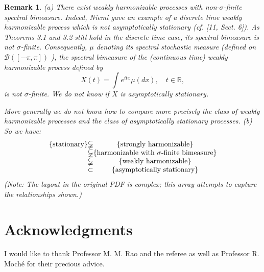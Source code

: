 \documentclass{article}
\begin{document}
\newtheorem{remark}{Remark}[section] %
\begin{remark} %
(a) There exist weakly harmonizable processes with non-\(\sigma\)-finite spectral bimeasure. Indeed, Niemi gave an example of a discrete time weakly harmonizable process which is not asymptotically stationary (cf. [11, Sect. 6]). As Theorems 3.1 and 3.2 still hold in the discrete time case, its spectral bimeasure is not \(\sigma\)-finite. Consequently, \(\mu\) denoting its spectral stochastic measure (defined on \(\mathscr{B}([-\pi, \pi])\) ), the spectral bimeasure of the (continuous time) weakly harmonizable process defined by
\[
X(t)=\int e^{i t x} \mu(d x), \quad t \in \mathbb{R},
\]
is not \(\sigma\)-finite. We do not know if \(X\) is asymptotically stationary.

More generally we do not know how to compare more precisely the class of weakly harmonizable processes and the class of asymptotically stationary processes.
(b) So we have:
\[
\begin{array}{c@{}c@{}c}
\{\text{stationary}\} & \varsubsetneqq & \{\text{strongly harmonizable}\} \\
& \varsubsetneqq & \{\text{harmonizable with } \sigma\text{-finite bimeasure}\} \\
& \varsubsetneqq & \{\text{weakly harmonizable}\} \\
& \subset & \{\text{asymptotically stationary}\}
\end{array}
\]
(Note: The layout in the original PDF is complex; this array attempts to capture the relationships shown.)
\end{remark}

\section*{Acknowledgments}

I would like to thank Professor M. M. Rao and the referee as well as Professor R. Moché for their precious advice.
\end{document}
